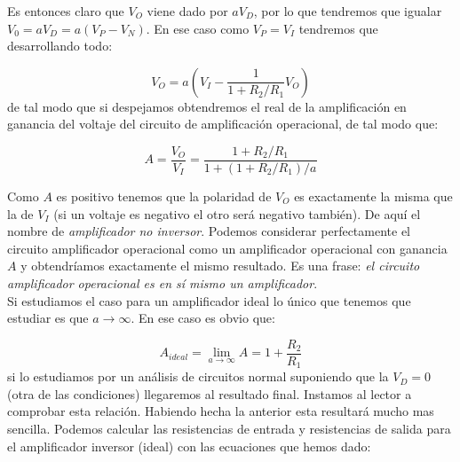 \documentclass[12pt,a4paper]{article}
\numberwithin{equation}{section}
\numberwithin{figure}{section}
\newcommand{\parentesis}[1]{\left( #1  \right)}
\begin{document}
Es entonces claro que $V_O$ viene dado por $aV_D$, por lo que tendremos que igualar $V_0 = a V_D = a (V_P - V_N)$. En ese caso como $V_P = V_I$ tendremos que desarrollando todo:

\begin{equation}
V_O = a \parentesis{V_I - \dfrac{1}{1+R_2/R_1} V_O} 
\end{equation} 
de tal modo que si despejamos obtendremos el real de la amplificación en ganancia del voltaje del circuito de amplificación operacional, de tal modo que:

\begin{equation}
A = \dfrac{V_O}{V_I} = \dfrac{1+R_2/R_1}{1+(1+R_2/R_1)/a}
\end{equation}

Como $A$ es positivo tenemos que la polaridad de $V_O$ es exactamente la misma que la de $V_I$ (si un voltaje es negativo el otro será negativo también). De aquí el nombre de \textit{amplificador no inversor}. Podemos considerar perfectamente el circuito amplificador operacional como un amplificador operacional con ganancia $A$ y obtendríamos exactamente el mismo resultado. Es una frase: \textit{el circuito amplificador operacional es en sí mismo un amplificador}. \\





Si estudiamos el caso para un amplificador ideal lo único que tenemos que estudiar es que $a \rightarrow \infty$. En ese caso es obvio que:

\begin{equation}
A_{ideal} = \lim_{a \rightarrow \infty} A = 1 + \dfrac{R_2}{R_1}
\end{equation}
si lo estudiamos por un análisis de circuitos normal suponiendo que la $V_D = 0$ (otra de las condiciones) llegaremos al resultado final. Instamos al lector a comprobar esta relación. Habiendo hecha la anterior esta resultará mucho mas sencilla. Podemos calcular las resistencias de entrada y resistencias de salida para el amplificador inversor (ideal) con las ecuaciones que hemos dado: \\
\end{document}
